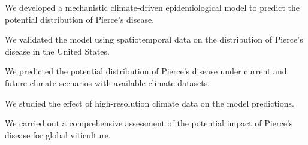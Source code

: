 \vspace{1cm}

\begin{contributionslist}
    \item We developed a mechanistic climate-driven epidemiological model to
    predict the potential distribution of Pierce's disease.

    \item We validated the model using spatiotemporal data on the distribution
    of Pierce's disease in the United States.

    \item We predicted the potential distribution of Pierce's disease under
    current and future climate scenarios with available climate datasets.

    \item We studied the effect of high-resolution climate data on the model
    predictions.

    \item We carried out a comprehensive assessment of the potential impact of
    Pierce's disease for global viticulture.
\end{contributionslist}